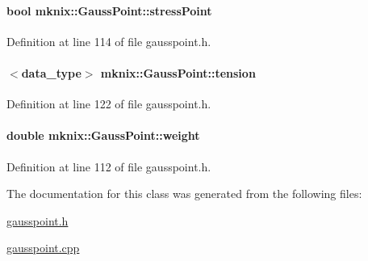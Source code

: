 \paragraph[{stress\+Point}]{\setlength{\rightskip}{0pt plus 5cm}bool mknix\+::\+Gauss\+Point\+::stress\+Point\hspace{0.3cm}{\ttfamily [protected]}}\label{classmknix_1_1_gauss_point_ad2cf2a84109ea9cb94bebd48aebfcff0}


Definition at line 114 of file gausspoint.\+h.

\hypertarget{classmknix_1_1_gauss_point_ace15b3e57fc0aa5622496c37b5defd1d}{}
\paragraph[{tension}]{$<${\bf data\+\_\+type}$>$ mknix\+::\+Gauss\+Point\+::tension\hspace{0.3cm}{\ttfamily [protected]}}\label{classmknix_1_1_gauss_point_ace15b3e57fc0aa5622496c37b5defd1d}


Definition at line 122 of file gausspoint.\+h.

\hypertarget{classmknix_1_1_gauss_point_af75968d801b5fcc70f253c0032fc6bdc}{}
\paragraph[{weight}]{\setlength{\rightskip}{0pt plus 5cm}double mknix\+::\+Gauss\+Point\+::weight\hspace{0.3cm}{\ttfamily [protected]}}\label{classmknix_1_1_gauss_point_af75968d801b5fcc70f253c0032fc6bdc}


Definition at line 112 of file gausspoint.\+h.



The documentation for this class was generated from the following files\+:\begin{DoxyCompactItemize}
\item 
\hyperlink{gausspoint_8h}{gausspoint.\+h}\item 
\hyperlink{gausspoint_8cpp}{gausspoint.\+cpp}\end{DoxyCompactItemize}
